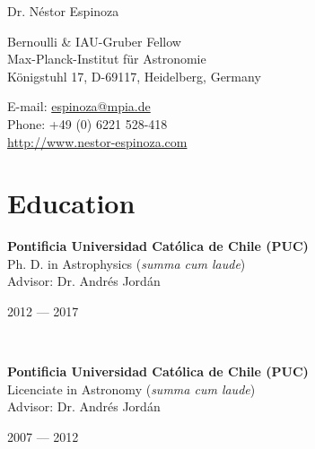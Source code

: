 \documentclass[11pt, a4paper]{article} %
\begin{document}

{\LARGE Dr. N\'estor Espinoza}\\[0.2cm] %
\begin{minipage}[t]{0.63\textwidth}
Bernoulli \& IAU-Gruber Fellow\\
Max-Planck-Institut f\"ur Astronomie\\
K\"onigstuhl 17, D-69117, Heidelberg, Germany \\
\end{minipage}
\begin{minipage}[t]{0.37\textwidth}
E-mail: \href{mailto:espinoza@mpia.de}{espinoza@mpia.de}\\
Phone: +49 (0) 6221 528-418\\ 
\url{http://www.nestor-espinoza.com}
\end{minipage}

\hrulefill
\section*{Education}


\begin{minipage}[t]{0.6\textwidth}
\begin{flushleft}%
  \setlength{\leftskip}{0.2cm}%
\textbf{Pontificia Universidad Cat\'olica de Chile (PUC)}\\
Ph. D. in Astrophysics (\textit{summa cum laude})\\
Advisor: Dr. Andr\'es Jord\'an
 
\end{flushleft}
\end{minipage}
\begin{minipage}[t]{0.4\textwidth}
\hfill 2012 --- 2017 
\end{minipage}\\

\begin{minipage}[t]{0.6\textwidth}
\begin{flushleft}%
  \setlength{\leftskip}{0.2cm}%
\textbf{Pontificia Universidad Cat\'olica de Chile (PUC)}\\
 Licenciate in Astronomy (\textit{summa cum laude})\\
 Advisor: Dr. Andr\'es Jord\'an
 \end{flushleft}
\end{minipage}
\begin{minipage}[t]{0.4\textwidth}
\hfill 2007 --- 2012 
\end{minipage}
\end{document}
